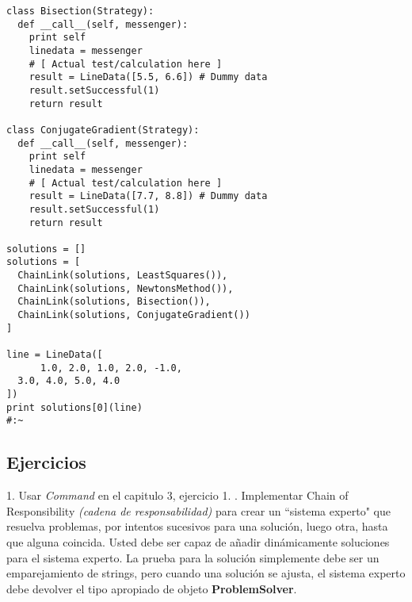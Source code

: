\begin{lstlisting}
class Bisection(Strategy): 
  def __call__(self, messenger): 
    print self 
    linedata = messenger 
    # [ Actual test/calculation here ] 
    result = LineData([5.5, 6.6]) # Dummy data 
    result.setSuccessful(1) 
    return result 
    
class ConjugateGradient(Strategy): 
  def __call__(self, messenger): 
    print self 
    linedata = messenger 
    # [ Actual test/calculation here ] 
    result = LineData([7.7, 8.8]) # Dummy data 
    result.setSuccessful(1) 
    return result 
    
solutions = [] 
solutions = [ 
  ChainLink(solutions, LeastSquares()), 
  ChainLink(solutions, NewtonsMethod()), 
  ChainLink(solutions, Bisection()), 
  ChainLink(solutions, ConjugateGradient()) 
] 

line = LineData([  
      1.0, 2.0, 1.0, 2.0, -1.0,  
  3.0, 4.0, 5.0, 4.0  
]) 
print solutions[0](line) 
#:~ 
\end{lstlisting}


\subsection*{Ejercicios}
\label{subsec:Ejercicios09}

1. Usar \textit{Command} en el capitulo 3, ejercicio 1.     . Implementar Chain of Responsibility \textit{(cadena de responsabilidad)} para crear un “sistema experto" que resuelva problemas, por intentos sucesivos para una solución, luego otra, hasta que alguna coincida. Usted debe ser capaz de añadir dinámicamente soluciones para el sistema experto. La prueba para la solución simplemente debe ser un emparejamiento de strings, pero cuando una solución se ajusta, el sistema experto debe devolver el tipo apropiado de objeto \textbf{ProblemSolver}.     \newline